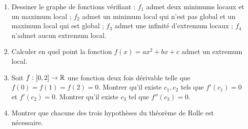 \begin{frame}
\begin{miniexercice}
\begin{enumerate}
  \item Dessiner le graphe de fonctions vérifiant :  $f_1$ admet deux minimums locaux et un maximum local ;
$f_2$ admet un minimum local qui n'est pas global et un maximum local qui est global ; 
$f_3$ admet une infinité d'extremum locaux ; $f_4$ n'admet aucun extremum local.
  \item Calculer en quel point la fonction $f(x)=ax^2+bx+c$ admet un extremum local.
  \item Soit $f : [0,2] \to \mathbb{R}$ une fonction deux fois dérivable telle que $f(0)=f(1)=f(2)=0$.
Montrer qu'il existe $c_1,c_2$ tels que $f'(c_1)=0$ et $f'(c_2)=0$. Montrer qu'il existe
$c_3$ tel que $f''(c_3)=0$.
  \item Montrer que chacune des trois hypothèses du théorème de Rolle est nécessaire.
\end{enumerate}
\end{miniexercice}
\end{frame}



